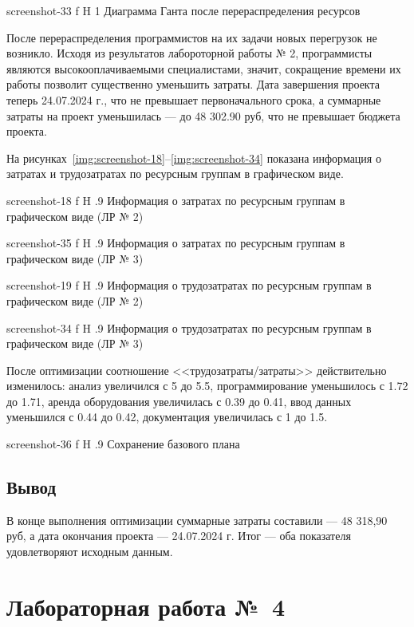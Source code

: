 \documentclass{bmstu}
\begin{document}
    {screenshot-33}
    {f}
    {H}
    {1\textwidth}
    {Диаграмма Ганта после перераспределения ресурсов}

После перераспределения программистов на их задачи новых перегрузок не возникло. 
Исходя из результатов лабороторной работы № 2, программисты являются высокооплачиваемыми специалистами, значит, сокращение времени их работы позволит существенно уменьшить затраты. 
Дата завершения проекта теперь 24.07.2024 г., что не превышает первоначального срока, а суммарные затраты на проект уменьшилась --- до 48 302.90 руб, что не превышает бюджета проекта.

На рисунках~\ref{img:screenshot-18}--\ref{img:screenshot-34} показана информация о затратах и трудозатратах по ресурсным группам в графическом виде.

    {screenshot-18}
    {f}
    {H}
    {.9\textwidth}
    {Информация о затратах по ресурсным группам в графическом виде (ЛР № 2)}

    {screenshot-35}
    {f}
    {H}
    {.9\textwidth}
    {Информация о затратах по ресурсным группам в графическом виде (ЛР № 3)}

    {screenshot-19}
    {f}
    {H}
    {.9\textwidth}
    {Информация о трудозатратах по ресурсным группам в графическом виде (ЛР № 2)}

    {screenshot-34}
    {f}
    {H}
    {.9\textwidth}
    {Информация о трудозатратах по ресурсным группам в графическом виде (ЛР № 3)}

После оптимизации соотношение <<трудозатраты/затраты>> действительно изменилось: анализ увеличился с 5 до 5.5, программирование уменьшилось с 1.72 до 1.71, аренда оборудования увеличилась с 0.39 до 0.41, ввод данных уменьшился с 0.44 до 0.42, документация увеличилась с 1 до 1.5.

    {screenshot-36}
    {f}
    {H}
    {.9\textwidth}
    {Сохранение базового плана}

\section{Вывод}

В конце выполнения оптимизации суммарные затраты составили --- 48 318,90 руб, а дата окончания проекта --- 24.07.2024 г. 
Итог --- оба показателя удовлетворяют исходным данным.

\chapter{Лабораторная работа №~4}
\end{document}
